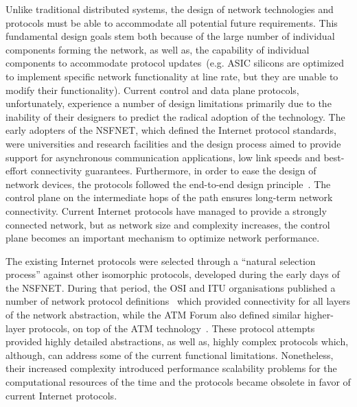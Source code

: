 Unlike traditional distributed systems, the design of network technologies and
protocols must be able to accommodate all potential future requirements. This
fundamental design goals stem both because of the large number of individual
components forming the network, as well
as, the capability of individual components to accommodate protocol
updates~(e.g. ASIC silicons are optimized to implement specific network
functionality at line rate, but they are unable to modify their functionality).
Current control and data plane protocols, unfortunately,  experience a
number of design limitations primarily due to the inability of their designers
to predict the radical adoption of the technology. 
The early adopters of the NSFNET, which defined the Internet protocol standards,
were universities and research facilities and the design process aimed to
provide support for asynchronous communication applications, low link speeds and
best-effort connectivity guarantees. Furthermore, in order to ease the design of
network devices, the protocols followed the end-to-end design
principle~\cite{end2endIP}. The control plane on the intermediate hops of the
path ensures long-term network connectivity.  Current Internet protocols have
managed to provide a strongly connected network, but as network size and
complexity increases, the control plane becomes an important mechanism to
optimize network performance.

The existing Internet protocols were selected through a ``natural selection
process'' against other isomorphic protocols, developed during the early days of
the NSFNET\@. During that period, the OSI and ITU organisations published a
number of network protocol definitions~\cite{x.213,x.233} which provided
connectivity for all layers of the network abstraction, while the ATM Forum also
defined similar higher-layer protocols, on top of the ATM
technology~\cite{Siu95}. These protocol attempts provided highly detailed
abstractions, as well as, highly complex protocols which, although, can address
some of the current functional limitations.  Nonetheless, their increased
complexity introduced performance scalability problems for the computational
resources of the time and the protocols became obsolete in favor of current
Internet protocols.

